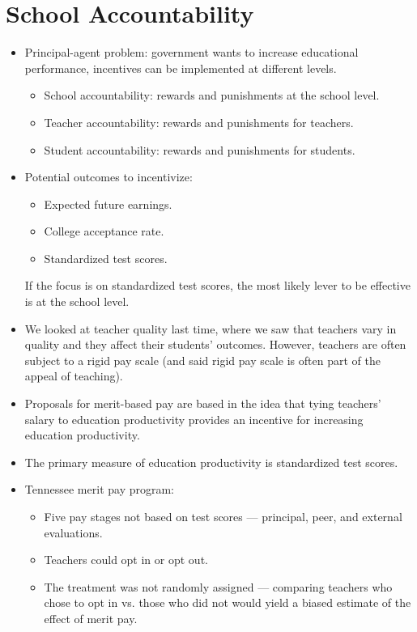 \documentclass[10pt]{extarticle}
\begin{document}
  \section{School Accountability}%
  \begin{itemize}
    \item Principal-agent problem: government wants to increase educational performance, incentives can be implemented at different levels.
      \begin{itemize}
        \item School accountability: rewards and punishments at the school level.
        \item Teacher accountability: rewards and punishments for teachers.
        \item Student accountability: rewards and punishments for students.
      \end{itemize}
    \item Potential outcomes to incentivize:
      \begin{itemize}
        \item Expected future earnings.
        \item College acceptance rate.
        \item Standardized test scores.
      \end{itemize}
      If the focus is on standardized test scores, the most likely lever to be effective is at the school level.
    \item We looked at teacher quality last time, where we saw that teachers vary in quality and they affect their students' outcomes. However, teachers are often subject to a rigid pay scale (and said rigid pay scale is often part of the appeal of teaching).
    \item Proposals for merit-based pay are based in the idea that tying teachers' salary to education productivity provides an incentive for increasing education productivity.
    \item The primary measure of education productivity is standardized test scores.
    \item Tennessee merit pay program:
      \begin{itemize}
        \item Five pay stages not based on test scores --- principal, peer, and external evaluations.
        \item Teachers could opt in or opt out.
        \item The treatment was not randomly assigned --- comparing teachers who chose to opt in vs. those who did not would yield a biased estimate of the effect of merit pay.

\end{itemize}
\end{itemize}
\end{document}
